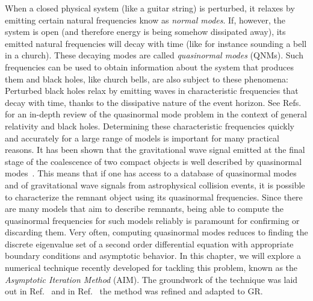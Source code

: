 When a closed physical system (like a guitar string) is perturbed, it relaxes by emitting certain natural frequencies know as \emph{normal modes}. If, however, the system is open (and therefore energy is being somehow dissipated away), its emitted natural frequencies will decay with time (like for instance sounding a bell in a church). These decaying modes are called \emph{quasinormal modes} (QNMs). Such frequencies can be used to obtain information about the system that produces them and black holes, like church bells, are also subject to these phenomena: Perturbed black holes relax by emitting waves in characteristic frequencies that decay with time, thanks to the dissipative nature of the event horizon. See Refs.~\cite{review1, review2, review3, review4} for an in-depth review of the quasinormal mode problem in the context of general relativity and black holes. Determining these characteristic frequencies quickly and accurately for a large range of models is important for many practical reasons. It has been shown that the gravitational wave signal emitted at the final stage of the coalescence of two compact objects is well described by quasinormal modes~\cite{buonanno,seidel}. This means that if one has access to a database of quasinormal modes and of gravitational wave signals from astrophysical collision events, it is possible to characterize the remnant object using its quasinormal frequencies. Since there are many models that aim to describe remnants, being able to compute the quasinormal frequencies for such models reliably is paramount for confirming or discarding them. Very often, computing quasinormal modes reduces to finding the discrete eigenvalue set of a second order differential equation with appropriate boundary conditions and asymptotic behavior. In this chapter, we will explore a numerical technique recently developed for tackling this problem, known as the \emph{Asymptotic Iteration Method} (AIM). The groundwork of the technique was laid out in Ref.~\cite{aim_original} and in Ref.~\cite{aim_improved} the method was refined and adapted to GR.

